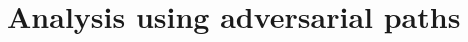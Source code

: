 \documentclass{ociamthesis}
\begin{document}

\section{Analysis using adversarial paths}
\label{section:adversarial-paths}
\end{document}
